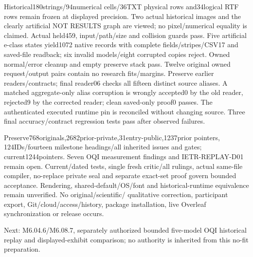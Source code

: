 \documentclass[11pt,a4paper]{article}
\begin{document}
Historical180strings/94numerical cells/36TXT physical rows and34logical
RTF rows remain frozen at displayed precision. Two actual historical
images and the clearly artificial NOT RESULTS graph are viewed;
no pixel/numerical equality is claimed. Actual held459, input/path/size
and collision guards pass. Five artificial e-class states yield1072
native records with complete fields/stripes/CSV17 and saved-file readback;
six invalid models/eight corrupted copies reject. Owned normal/error
cleanup and empty preserve stack pass. Twelve original owned request/output
pairs contain no research fits/margins. Preserve earlier readers/contracts;
final reader06 checks all fifteen distinct source aliases. A matched
aggregate-only alias corruption is wrongly accepted0 by the old reader,
rejected9 by the corrected reader; clean saved-only proof0 passes. The
authenticated executed runtime pin is reconciled without changing source.
Three final accuracy/contract regression tests pass after observed failures.

Preserve768originals,2682prior-private,31entry-public,1237prior pointers,
124IDs/fourteen milestone headings/all inherited issues and gates;
current1244pointers. Seven OQI measurement findings and IETR-REPLAY-D01
remain open. Current/dated tests, single fresh critic/all rulings,
actual same-file compiler, no-replace private seal and separate exact-set
proof govern bounded acceptance. Rendering, shared-default/OS/font and
historical-runtime equivalence remain unverified. No original/scientific/
qualitative correction, participant export, Git/cloud/access/history,
package installation, live Overleaf synchronization or release occurs.

Next: M6.04.6/M6.08.7, separately authorized bounded five-model OQI
historical replay and displayed-exhibit comparison; no authority is
inherited from this no-fit preparation.
\end{document}
